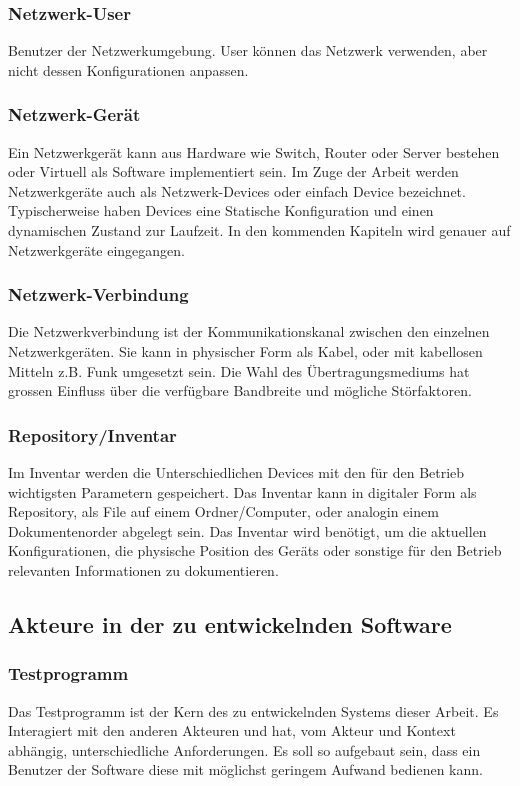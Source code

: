 \documentclass[]{subfiles}
\begin{document}
    \subsubsection*{Netzwerk-User}
    Benutzer der Netzwerkumgebung. User können das Netzwerk verwenden,
    aber nicht dessen Konfigurationen anpassen.


    \subsubsection*{Netzwerk-Gerät}
    Ein Netzwerkgerät kann aus Hardware wie Switch, Router oder Server
    bestehen oder Virtuell als Software implementiert sein. 
    Im Zuge der Arbeit werden Netzwerkgeräte auch als Netzwerk-Devices 
    oder einfach Device bezeichnet. 
    Typischerweise haben Devices eine Statische Konfiguration und einen 
    dynamischen Zustand zur Laufzeit. 
    In den kommenden Kapiteln wird genauer auf Netzwerkgeräte eingegangen.

    \subsubsection*{Netzwerk-Verbindung}
    Die Netzwerkverbindung ist der Kommunikationskanal zwischen den einzelnen
    Netzwerkgeräten. Sie kann in physischer Form als Kabel, oder mit kabellosen
    Mitteln z.B. Funk umgesetzt sein. Die Wahl des Übertragungsmediums hat
    grossen Einfluss über die verfügbare Bandbreite und mögliche Störfaktoren.

    \subsubsection*{Repository/Inventar}
    Im Inventar werden die Unterschiedlichen Devices mit den für den 
    Betrieb wichtigsten Parametern gespeichert. 
    Das Inventar kann in digitaler Form als Repository, 
    als File auf einem Ordner/Computer, 
    oder analogin einem Dokumentenorder abgelegt sein. 
    Das Inventar wird benötigt, um die aktuellen Konfigurationen, 
    die physische Position des Geräts oder sonstige für den Betrieb 
    relevanten Informationen zu dokumentieren.

    \newpage

    \subsection{Akteure in der zu entwickelnden Software}

    \subsubsection*{Testprogramm}
    Das Testprogramm ist der Kern des zu entwickelnden Systems dieser Arbeit.
    Es Interagiert mit den anderen Akteuren und hat, vom Akteur und Kontext abhängig, 
    unterschiedliche Anforderungen.
    Es soll so aufgebaut sein, dass ein Benutzer der Software diese mit möglichst 
    geringem Aufwand bedienen kann.
\end{document}
